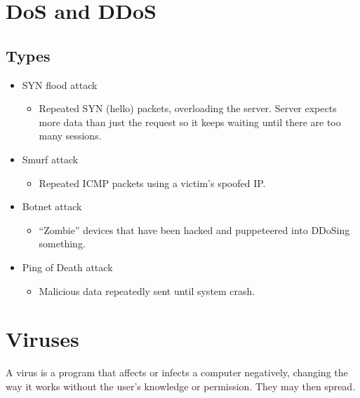 \documentclass[12pt]{report}
\begin{document}
\pagebreak

\section{DoS and DDoS}
\subsection{Types}
\begin{multicols}{2}
\begin{itemize}
	\item SYN flood attack
		\begin{itemize}
			\item Repeated SYN (hello) packets, overloading the server. Server expects more data than just the request so it keeps waiting until there are too many sessions.
		\end{itemize}
	\item Smurf attack 
		\begin{itemize}
			\item Repeated ICMP packets using a victim's spoofed IP.
		\end{itemize}
	\item Botnet attack
		\begin{itemize}
			\item ``Zombie'' devices that have been hacked and puppeteered into DDoSing something.
		\end{itemize}
	\item Ping of Death attack
		\begin{itemize}
			\item Malicious data repeatedly sent until system crash.
		\end{itemize}

\end{itemize}
\end{multicols}

\section{Viruses}
A virus is a program that affects or infects a computer negatively, changing the way it works without the user's knowledge or permission. They may then spread.
\end{document}
